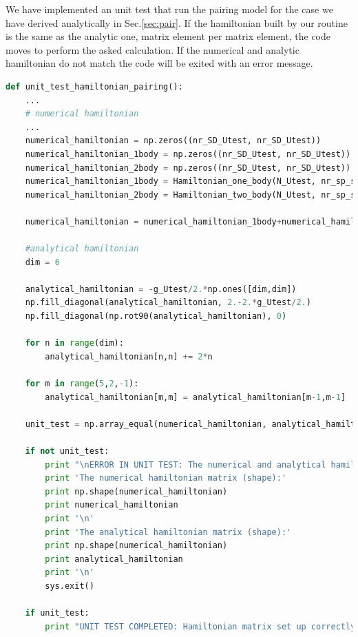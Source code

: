 \documentclass[twoside]{article}
\begin{document}
We have implemented an unit test that run the pairing model for the case we have derived analytically in Sec.\ref{sec:pair}. If the hamiltonian built by our routine is the same as the analytic one, matrix element per matrix element, the code moves to perform the asked calculation. If the numerical and analytic hamiltonian do not match the code will be exited with an error message.  

\begin{lstlisting}[language=Python, caption= \texttt{unit\_test\_hamiltonian\_pairing()} is a unit test run by \texttt{main.py} before it starts to set up the actual Hamiltonian matrix]
def unit_test_hamiltonian_pairing():
    ... 
    # numerical hamiltonian
    ...
    numerical_hamiltonian = np.zeros((nr_SD_Utest, nr_SD_Utest))
    numerical_hamiltonian_1body = np.zeros((nr_SD_Utest, nr_SD_Utest))
    numerical_hamiltonian_2body = np.zeros((nr_SD_Utest, nr_SD_Utest))
    numerical_hamiltonian_1body = Hamiltonian_one_body(N_Utest, nr_sp_states_Utest, sp_matrix_Utest, SD_filename_Utest)
    numerical_hamiltonian_2body = Hamiltonian_two_body(N_Utest, nr_sp_states_Utest, SD_filename_Utest, tbme_filename_Utest, 'pairing')

    numerical_hamiltonian = numerical_hamiltonian_1body+numerical_hamiltonian_2body

    #analytical hamiltonian
    dim = 6
    
    analytical_hamiltonian = -g_Utest/2.*np.ones([dim,dim])
    np.fill_diagonal(analytical_hamiltonian, 2.-2.*g_Utest/2.)
    np.fill_diagonal(np.rot90(analytical_hamiltonian), 0)

    for n in range(dim):
        analytical_hamiltonian[n,n] += 2*n

    for m in range(5,2,-1):
        analytical_hamiltonian[m,m] = analytical_hamiltonian[m-1,m-1]

    unit_test = np.array_equal(numerical_hamiltonian, analytical_hamiltonian)

    if not unit_test:
        print "\nERROR IN UNIT TEST: The numerical and analytical hamiltonian matrix are not equal!\n"
        print 'The numerical hamiltonian matrix (shape):'
        print np.shape(numerical_hamiltonian)
        print numerical_hamiltonian
        print '\n'
        print 'The analytical hamiltonian matrix (shape):'
        print np.shape(numerical_hamiltonian)
        print analytical_hamiltonian
        print '\n'
        sys.exit()
        
    if unit_test:
        print "UNIT TEST COMPLETED: Hamiltonian matrix set up correctly.\n"
\end{lstlisting}
\end{document}
